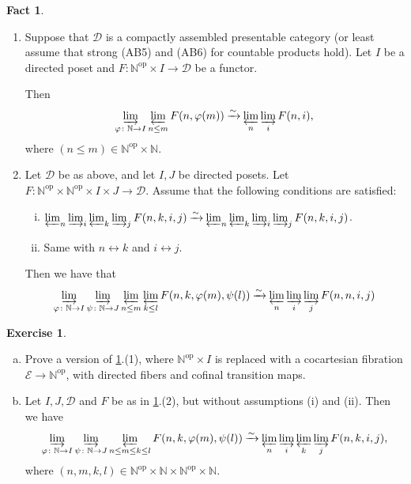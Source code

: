 \documentclass[draft]{amsart}
\newcommand{\NN}{\mathbb{N}}
\newcommand{\cat}[1]{\mathcal{#1}}
\newcommand{\op}{\mathrm{op}}
\newcommand{\isoto}{\mathbin{\xrightarrow{\sim}}}
\theoremstyle{definition}
\newtheorem{fact}[thm]{Fact}
\newtheorem{exercise}[thm]{Exercise}
\begin{document}
\begin{fact}\label{Efimov:fact}
\begin{enumerate}[(1)]
\item Suppose that $\cat D$ is a compactly assembled presentable category (or least assume that strong (AB5) and (AB6) for countable products hold). Let $I$ be a directed poset and $F\colon \NN^\op \times I \to \cat D$ be a functor.

Then 
\[
\varinjlim_{\varphi\colon \NN\to I} \varprojlim_{n\le m} F(n, \varphi(m)) \isoto  \varprojlim_n \varinjlim_i F(n,i),
\]
where $(n\le m) \in \NN^{\op}\times \NN$.

\item Let $\cat D$ be as above, and let $I, J$ be directed posets. Let $F\colon \NN^\op \times \NN^\op \times I\times J \to \cat D$. Assume that the following conditions are satisfied:
\begin{enumerate}[(i)]
\item $\varprojlim_n \varinjlim_i \varprojlim_k \varinjlim_j F(n,k,i,j) \isoto \varprojlim_n \varprojlim_k \varinjlim_i \varinjlim_j F(n,k,i,j)$.

\item Same with $n\leftrightarrow k$ and $i\leftrightarrow j$.
\end{enumerate}
Then we have that
\[
\varinjlim_{\varphi\colon \NN\to I} \varinjlim_{\psi\colon \NN\to J} \varprojlim_{n\le m} \varprojlim_{k\le l} F(n,k,\varphi(m), \psi(l)) \isoto
\varprojlim_n \varinjlim_i \varinjlim_j F(n,n,i,j)
\]
\end{enumerate}
\end{fact}

\begin{exercise}
\begin{enumerate}[(a)]
\item Prove a version of \cref{Efimov:fact}.(1), where $\NN^\op \times I$ is replaced with a cocartesian fibration $\cat E \to \NN^\op$, with directed fibers and cofinal transition maps.

\item Let $I, J, \cat D$ and $F$ be as in \cref{Efimov:fact}.(2), but without assumptions (i) and (ii). Then we have
\[
\varinjlim_{\varphi\colon \NN\to I} \varinjlim_{\psi\colon \NN\to J} \varprojlim_{n\le m\le k\le l} F(n,k, \varphi(m), \psi(l))
\isoto
\varprojlim_n \varinjlim_i \varprojlim_k \varinjlim_j F(n,k,i,j),
\]
where $(n,m,k,l) \in \NN^\op \times \NN \times \NN^\op \times \NN$.
\end{enumerate}
\end{exercise}
\end{document}
